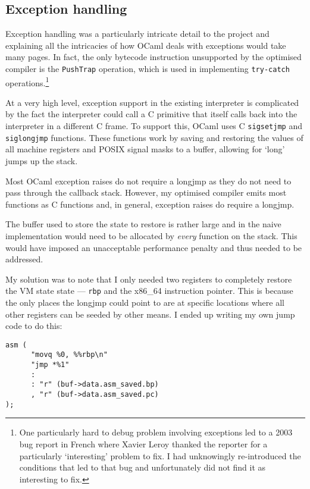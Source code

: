 \subsection{Exception handling} \label{exception-handling}

Exception handling was a particularly intricate detail to the project and explaining all the
intricacies of how OCaml deals with exceptions would take many pages. In fact, the only bytecode
instruction unsupported by the optimised compiler is the \texttt{PushTrap} operation, which is used
in implementing \texttt{try-catch} operations.\footnote{
      One particularly hard to debug problem involving exceptions led to a 2003 bug report in
      French where Xavier Leroy thanked the reporter for a particularly `interesting' problem to
      fix. I
      had unknowingly re-introduced the conditions that led to that bug and unfortunately did not
      find it
      as interesting to fix.}

At a very high level, exception support in the existing interpreter is complicated by the fact the
interpreter could call a C primitive that itself calls back into the interpreter in a different C
frame. To support this, OCaml uses C \texttt{sigsetjmp} and \texttt{siglongjmp} functions. These
functions work by saving and restoring the values of all machine registers and POSIX signal masks
to a buffer, allowing for `long' jumps up the stack.

Most OCaml exception raises do not require a longjmp as they do not need to pass through
the callback stack. However, my optimised compiler emits most functions as C functions and, in
general, exception raises do require a longjmp.

The buffer used to store the state to restore is rather large and in the naive implementation would
need to be allocated by \emph{every} function on the stack.  This would have imposed an
unacceptable
performance penalty and thus needed to be addressed.

My solution was to note that I only needed two registers to completely restore the VM state
state --- \texttt{rbp} and the x86\_64 instruction pointer. This is because the only places the
longjmp could point to are at specific locations where all other registers can be seeded by other
means. I ended up writing my own jump code to do this:

\begin{verbatim}
asm (
      "movq %0, %%rbp\n"
      "jmp *%1"
      :
      : "r" (buf->data.asm_saved.bp)
      , "r" (buf->data.asm_saved.pc)
);
\end{verbatim}

